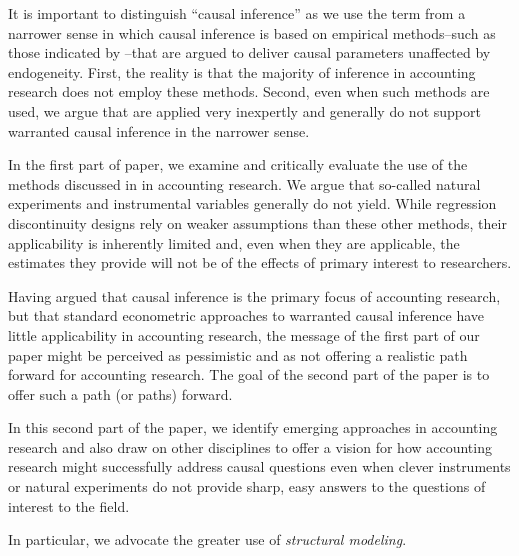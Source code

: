It is important to distinguish ``causal inference'' as we use the term from a narrower sense in which causal inference is based on empirical methods--such as those indicated by \cite{Angrist:2010jv}--that are argued to deliver causal parameters unaffected by endogeneity. First, the reality is that the majority of inference in accounting research does not employ these methods. Second, even when such methods are used, we argue that are applied very inexpertly and generally do not support warranted causal inference in the narrower sense.

In the first part of paper, we examine and critically evaluate the use of the methods discussed in \cite{Angrist:2010jv} in accounting research. We argue that so-called natural experiments and instrumental variables generally do not yield.
While regression discontinuity designs rely on weaker assumptions than these other methods, their applicability is inherently limited and, even when they are applicable, the estimates they provide will not be of the effects of primary interest to researchers.

Having argued that causal inference is the primary focus of accounting research, but that standard econometric approaches to warranted causal inference have little applicability in accounting research, the message of the first part of our paper might be perceived as pessimistic and as not offering a realistic path forward for accounting research. 
The goal of the second part of the paper is to offer such a path (or paths) forward. 

In this second part of the paper, we identify emerging approaches in accounting research and also draw on other disciplines to offer a vision for how accounting research might successfully address causal questions even when clever instruments or natural experiments do not provide sharp, easy answers to the questions of interest to the field.

In particular, we advocate the greater use of \emph{structural modeling}. 

